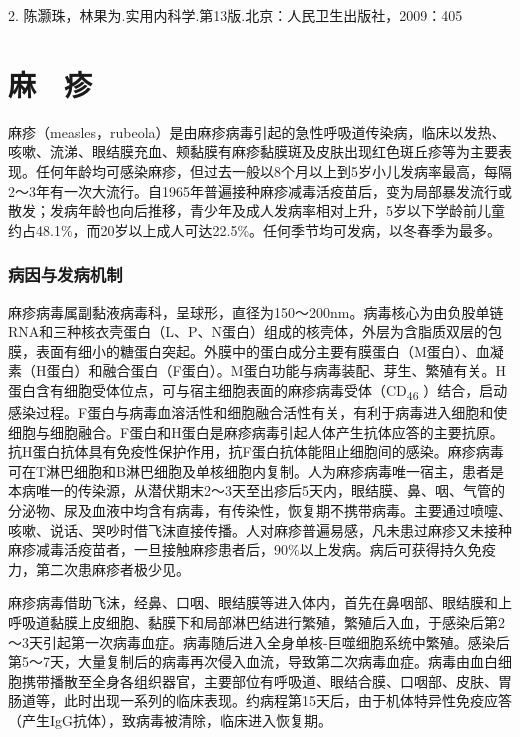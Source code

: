 2. 陈灏珠，林果为.实用内科学.第13版.北京：人民卫生出版社，2009：405

\protect\hypertarget{text00217.html}{}{}

\chapter{麻　疹}

麻疹（measles，rubeola）是由麻疹病毒引起的急性呼吸道传染病，临床以发热、咳嗽、流涕、眼结膜充血、颊黏膜有麻疹黏膜斑及皮肤出现红色斑丘疹等为主要表现。任何年龄均可感染麻疹，但过去一般以8个月以上到5岁小儿发病率最高，每隔2～3年有一次大流行。自1965年普遍接种麻疹减毒活疫苗后，变为局部暴发流行或散发；发病年龄也向后推移，青少年及成人发病率相对上升，5岁以下学龄前儿童约占48.1\%，而20岁以上成人可达22.5\%。任何季节均可发病，以冬春季为最多。

\subsection{病因与发病机制}

麻疹病毒属副黏液病毒科，呈球形，直径为150～200nm。病毒核心为由负股单链RNA和三种核衣壳蛋白（L、P、N蛋白）组成的核壳体，外层为含脂质双层的包膜，表面有细小的糖蛋白突起。外膜中的蛋白成分主要有膜蛋白（M蛋白）、血凝素（H蛋白）和融合蛋白（F蛋白）。M蛋白功能与病毒装配、芽生、繁殖有关。H蛋白含有细胞受体位点，可与宿主细胞表面的麻疹病毒受体（CD\textsubscript{46}
）结合，启动感染过程。F蛋白与病毒血溶活性和细胞融合活性有关，有利于病毒进入细胞和使细胞与细胞融合。F蛋白和H蛋白是麻疹病毒引起人体产生抗体应答的主要抗原。抗H蛋白抗体具有免疫性保护作用，抗F蛋白抗体能阻止细胞间的感染。麻疹病毒可在T淋巴细胞和B淋巴细胞及单核细胞内复制。人为麻疹病毒唯一宿主，患者是本病唯一的传染源，从潜伏期末2～3天至出疹后5天内，眼结膜、鼻、咽、气管的分泌物、尿及血液中均含有病毒，有传染性，恢复期不携带病毒。主要通过喷嚏、咳嗽、说话、哭吵时借飞沫直接传播。人对麻疹普遍易感，凡未患过麻疹又未接种麻疹减毒活疫苗者，一旦接触麻疹患者后，90\%以上发病。病后可获得持久免疫力，第二次患麻疹者极少见。

麻疹病毒借助飞沫，经鼻、口咽、眼结膜等进入体内，首先在鼻咽部、眼结膜和上呼吸道黏膜上皮细胞、黏膜下和局部淋巴结进行繁殖，繁殖后入血，于感染后第2～3天引起第一次病毒血症。病毒随后进入全身单核-巨噬细胞系统中繁殖。感染后第5～7天，大量复制后的病毒再次侵入血流，导致第二次病毒血症。病毒由血白细胞携带播散至全身各组织器官，主要部位有呼吸道、眼结合膜、口咽部、皮肤、胃肠道等，此时出现一系列的临床表现。约病程第15天后，由于机体特异性免疫应答（产生IgG抗体），致病毒被清除，临床进入恢复期。

